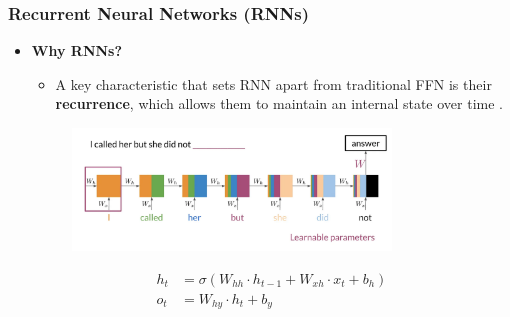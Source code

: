 \documentclass{beamer}
\begin{document}
\begin{frame}
\frametitle{Recurrent Neural Networks (RNNs)}
    \begin{itemize}
        \item \textbf{Why RNNs?}
        \begin{itemize}
            \item A key characteristic that sets RNN apart from traditional FFN is their \textbf{recurrence}, which allows them to maintain an internal state over time .
                \end{itemize}
            \begin{figure}[h]  %
                \centering
                \includegraphics[width=0.8\textwidth]{RNN.png}
            \end{figure}     
            \begin{align}
            h_t &= \sigma(W_{hh} \cdot h_{t-1} + W_{xh} \cdot x_t + b_h) \\
            o_t &= W_{hy} \cdot h_t + b_y
        \end{align}
    \end{itemize}
\end{frame}
    
    
    
    
\end{document}
